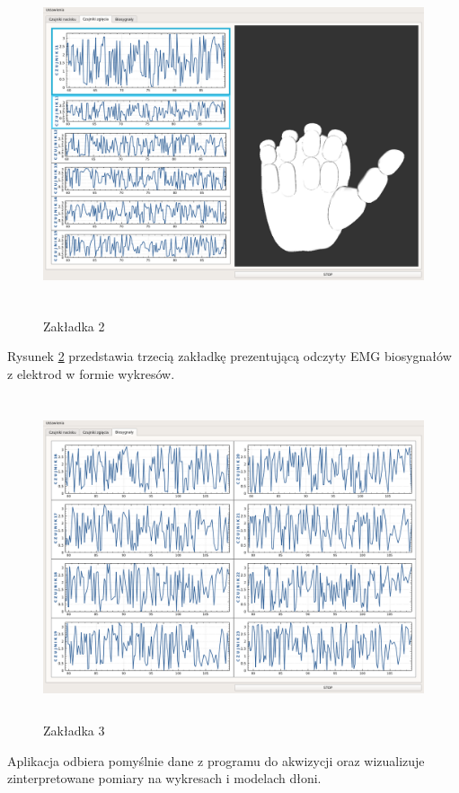 \documentclass{article}
\begin{document}
\begin{figure}[H]
    \centering
    \includegraphics[width=16cm, height=10cm]{zakladka2.png}
    \caption{Zakładka 2}
    \label{rys:zakladka2}
\end{figure}
Rysunek \ref{rys:zakladka3} przedstawia trzecią zakładkę prezentującą odczyty EMG biosygnałów z elektrod w formie wykresów.
\begin{figure}[H]
    \centering
    \includegraphics[width=16cm, height=9.5cm]{zakladka3.png}
    \caption{Zakładka 3}
    \label{rys:zakladka3}
\end{figure}


Aplikacja odbiera pomyślnie dane z programu do akwizycji oraz wizualizuje zinterpretowane pomiary na wykresach i modelach dłoni. 
\end{document}
